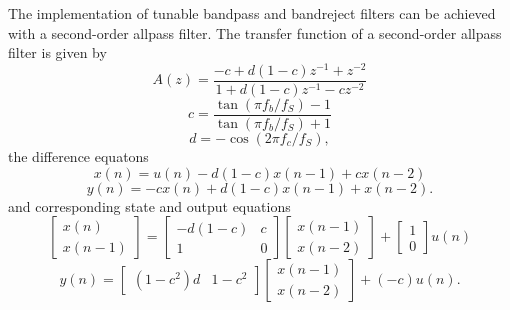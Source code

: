 \documentclass[10pt,a4paper,oneside]{article}
\begin{document}
The implementation of tunable bandpass and bandreject filters can be achieved with a second-order allpass filter. The transfer function of a second-order allpass filter is given by
\[
A(z) = \frac{-c + d(1-c)z^{-1} + z^{-2}}{1 + d(1-c)z^{-1} - cz^{-2}}
\]
\[
c = \frac{\tan(\pi f_b/f_S) - 1}{\tan(\pi f_b/f_S) + 1}
\]
\[
d = -\cos(2\pi f_c/f_S),
\]
the difference equatons
\[
x(n) = u(n) - d(1-c)x(n-1) + cx(n-2)
\]
\[
y(n) = -cx(n) + d(1-c)x(n-1) + x(n-2).
\]
and corresponding state and output equations
\[
\begin{bmatrix}x(n)\\x(n-1)\end{bmatrix} = \begin{bmatrix}
-d(1-c)&c\\
1&0
\end{bmatrix}
\begin{bmatrix}x(n-1)\\x(n-2)\end{bmatrix} + \begin{bmatrix}1\\0\end{bmatrix}
u(n)\]
\[
y(n) = \begin{bmatrix}(1-c^2)d&1-c^2\end{bmatrix}
\begin{bmatrix}x(n-1)\\x(n-2)\end{bmatrix} + (-c)u(n).
\]
\end{document}
